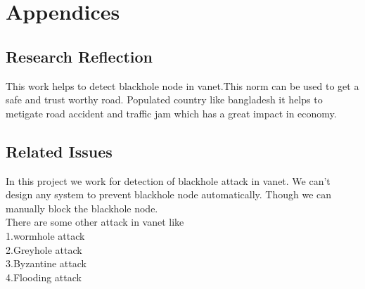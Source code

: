 
\chapter{Appendices} %

\label{AppendixA} %


\section{Research Reflection}
This work helps to detect blackhole node in vanet.This norm can be used to get a safe and trust worthy road. Populated country like bangladesh it helps to metigate road accident and traffic jam which has a great impact in economy.  

\section{Related Issues}
In this project we work for detection of blackhole attack in vanet. We can't design any system to prevent blackhole node automatically. Though we can manually block the blackhole node. \\There are some other attack in vanet like \\
1.wormhole attack\\
2.Greyhole attack\\
3.Byzantine attack\\
4.Flooding attack
